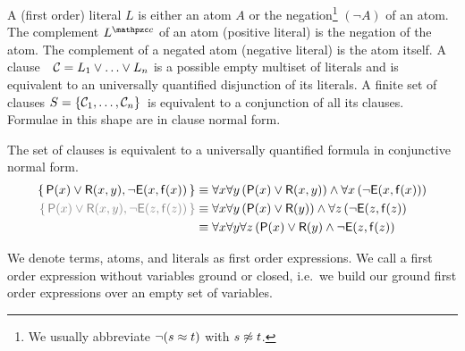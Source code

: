 
\begin{definition}[\CNF]\label{def:literals}\label{def:syntax:CNF}
A (first order) {\myem literal} $L$ is either an atom $A$ or the negation\footnote{
	We usually abbreviate $\lnot(s\approx t)$ with $s\not\approx t$.
} 
$(\lnot A)$ of an atom.
%
The {\myem complement} $L^\mcc$ of an atom (positive literal) is the negation of the atom.
The complement of a negated atom (negative literal) is the atom itself. 
%
A {\myem clause}\ \ ${\mathcal C} = L_1\lor\ldots\lor L_n$  is a possible empty multiset of literals 
and is equivalent to an universally quantified disjunction of its literals.
%
A finite {\myem set of clauses} $S=\{ {\mathcal C}_1,\ldots,{\mathcal C}_n \}$ is equivalent to a conjunction of all its clauses.
%
Formulae in this shape are in {\myem clause normal form}.
\end{definition}

\begin{example}The set of clauses is equivalent to a universally quantified formula in conjunctive normal form.
	\begin{align*}
		\{\, \mP(x)\lor\mR(x,y), \lnot \mE(x,\mf(x)) \, \}
		&\equiv
		\forall x \forall y\, (\mP(x)\lor\mR(x,y))
		\land
		\forall x\, (\lnot \mE(x,\mf(x))) 
		\\
		{\colG
			\{\, \mP(x)\lor\mR(x,y), \lnot \mE(z,\mf(z)) \, \}}
		&\equiv
		\forall x \forall y\, (\mP(x)\lor\mR(y))
		\land
		\forall z\,(\lnot \mE(z,\mf(z)) 
		\\
		&\equiv
		\forall x \forall y\forall z\, 
		(\mP(x)\lor\mR(y)\land \lnot \mE(z,\mf(z))
	\end{align*}
\end{example}

\begin{definition}
	We denote
	terms, atoms, and literals as first order expressions.
	We call a first order expression without variables {\myem ground} or {\myem closed}, 
	i.e.~we build our ground first order expressions over an empty set of variables.
\end{definition}

